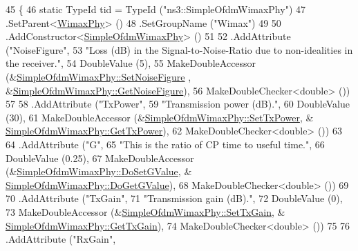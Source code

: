 \begin{DoxyCode}
45 \{
46   \textcolor{keyword}{static} TypeId tid = TypeId (\textcolor{stringliteral}{"ns3::SimpleOfdmWimaxPhy"})
47     .SetParent<\hyperlink{classns3_1_1WimaxPhy_afb59a12d1d4eb78a33ca0929900cbc37}{WimaxPhy}> ()
48     .SetGroupName (\textcolor{stringliteral}{"Wimax"})
49     
50     .AddConstructor<\hyperlink{classns3_1_1SimpleOfdmWimaxPhy_ac75a81050a2e1e801481a10cffa23b5f}{SimpleOfdmWimaxPhy}> ()
51 
52     .AddAttribute (\textcolor{stringliteral}{"NoiseFigure"},
53                    \textcolor{stringliteral}{"Loss (dB) in the Signal-to-Noise-Ratio due to non-idealities in the receiver."},
54                    DoubleValue (5),
55                    MakeDoubleAccessor (&\hyperlink{classns3_1_1SimpleOfdmWimaxPhy_a426cbb568da87f5fa7f65551df9da56c}{SimpleOfdmWimaxPhy::SetNoiseFigure}
      , &\hyperlink{classns3_1_1SimpleOfdmWimaxPhy_a713b5f8355ab5fe168b20dfc9d33b944}{SimpleOfdmWimaxPhy::GetNoiseFigure}),
56                    MakeDoubleChecker<double> ())
57 
58     .AddAttribute (\textcolor{stringliteral}{"TxPower"},
59                    \textcolor{stringliteral}{"Transmission power (dB)."},
60                    DoubleValue (30),
61                    MakeDoubleAccessor (&\hyperlink{classns3_1_1SimpleOfdmWimaxPhy_a7bfbb97865ba8c807191e3650b06f244}{SimpleOfdmWimaxPhy::SetTxPower}, &
      \hyperlink{classns3_1_1SimpleOfdmWimaxPhy_a1b8b0f59960472009964cf7f115214d9}{SimpleOfdmWimaxPhy::GetTxPower}),
62                    MakeDoubleChecker<double> ())
63 
64     .AddAttribute (\textcolor{stringliteral}{"G"},
65                    \textcolor{stringliteral}{"This is the ratio of CP time to useful time."},
66                    DoubleValue (0.25),
67                    MakeDoubleAccessor (&\hyperlink{classns3_1_1SimpleOfdmWimaxPhy_a18db48588368edf80959491e93517ecc}{SimpleOfdmWimaxPhy::DoSetGValue}, &
      \hyperlink{classns3_1_1SimpleOfdmWimaxPhy_aadef9c3fe049f03d4a51ce14f3afadd7}{SimpleOfdmWimaxPhy::DoGetGValue}),
68                    MakeDoubleChecker<double> ())
69 
70     .AddAttribute (\textcolor{stringliteral}{"TxGain"},
71                    \textcolor{stringliteral}{"Transmission gain (dB)."},
72                    DoubleValue (0),
73                    MakeDoubleAccessor (&\hyperlink{classns3_1_1SimpleOfdmWimaxPhy_ab5c2e7555bec65deffc695c90b2ce69b}{SimpleOfdmWimaxPhy::SetTxGain}, &
      \hyperlink{classns3_1_1SimpleOfdmWimaxPhy_af9cb6087a75341f52c3985e37b860d4c}{SimpleOfdmWimaxPhy::GetTxGain}),
74                    MakeDoubleChecker<double> ())
75 
76     .AddAttribute (\textcolor{stringliteral}{"RxGain"},

\end{DoxyCode}
